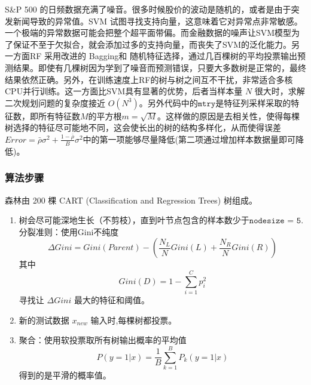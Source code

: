\documentclass[11pt, a4paper]{article}
\begin{document}
S\&P 500 的日频数据充满了噪音。很多时候股价的波动是随机的，或者是由于突发新闻导致的异常值。SVM 试图寻找支持向量，这意味着它对异常点非常敏感。一个极端的异常数据可能会把整个超平面带偏。而金融数据的噪声让SVM模型为了保证不至于欠拟合，就会添加过多的支持向量，而丧失了SVM的泛化能力。另一方面RF 采用改进的 Bagging和 随机特征选择，通过几百棵树的平均投票输出预测结果。即使有几棵树因为学到了噪音而预测错误，只要大多数树是正常的，最终结果依然正确。另外，在训练速度上RF的树与树之间互不干扰，非常适合多核CPU并行训练。这一方面比SVM具有显著的优势，后者当样本量 $N$ 很大时，求解二次规划问题的复杂度接近 $O(N^3)$。另外代码中的$\texttt{mtry}$是特征列采样采取的特征数，即所有特征数$M$的平方根$m=\sqrt{M}$。这样做的原因是去相关性，使得每棵树选择的特征尽可能地不同，这会使长出的树的结构多样化，从而使得误差$Error = \bar{\rho} \sigma^2 + \frac{1-\bar{\rho}}{B} \sigma^2$中的第一项能够尽量降低(第二项通过增加样本数据量即可降低)。

\subsubsection{算法步骤}

森林由 200 棵 CART (Classification and Regression Trees) 树组成。
\begin{enumerate}
    \item 树会尽可能深地生长（不剪枝），直到叶节点包含的样本数少于$\texttt{nodesize = 5}$.分裂准则：使用Gini不纯度$$\Delta Gini = Gini(Parent) - \left( \frac{N_L}{N} Gini(L) + \frac{N_R}{N} Gini(R) \right)$$其中$$Gini(D) = 1 - \sum_{i=1}^{C} p_i^2$$寻找让 $\Delta Gini$ 最大的特征和阈值。
    \item 新的测试数据 $x_{new}$ 输入时,每棵树都投票。
    \item 聚合：使用软投票取所有树输出概率的平均值$$P(y=1|x) = \frac{1}{B} \sum_{k=1}^{B} P_k(y=1|x)$$得到的是平滑的概率值。
\end{enumerate}
\end{document}
